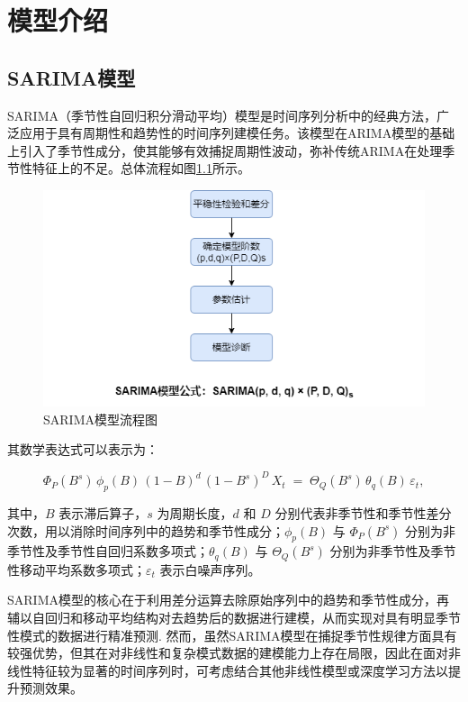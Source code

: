 \chapter{模型介绍}
\label{chapter:model}
\section{SARIMA模型}

SARIMA（季节性自回归积分滑动平均）模型是时间序列分析中的经典方法，广泛应用于具有周期性和趋势性的时间序列建模任务。该模型在ARIMA模型的基础上引入了季节性成分，使其能够有效捕捉周期性波动，弥补传统ARIMA在处理季节性特征上的不足。总体流程如图\ref{fig:SARIMA模型流程图}所示。

\begin{figure}[H]
    \centering
    \includegraphics[width=0.75\linewidth]{figure/SARIMA_formula.png}
    \caption{SARIMA模型流程图}
    \label{fig:SARIMA模型流程图}
\end{figure}

其数学表达式可以表示为：

\[
\Phi_P(B^s) \, \phi_p(B) \, (1-B)^d \, (1-B^s)^D \, X_t \;=\; \Theta_Q(B^s) \, \theta_q(B) \, \varepsilon_t,
\]

其中，\( B \) 表示滞后算子，\( s \) 为周期长度，\( d \) 和 \( D \) 分别代表非季节性和季节性差分次数，用以消除时间序列中的趋势和季节性成分；\( \phi_p(B) \) 与 \( \Phi_P(B^s) \) 分别为非季节性及季节性自回归系数多项式；\( \theta_q(B) \) 与 \( \Theta_Q(B^s) \) 分别为非季节性及季节性移动平均系数多项式；\( \varepsilon_t \) 表示白噪声序列。

SARIMA模型的核心在于利用差分运算去除原始序列中的趋势和季节性成分，再辅以自回归和移动平均结构对去趋势后的数据进行建模，从而实现对具有明显季节性模式的数据进行精准预测. 然而，虽然SARIMA模型在捕捉季节性规律方面具有较强优势，但其在对非线性和复杂模式数据的建模能力上存在局限，因此在面对非线性特征较为显著的时间序列时，可考虑结合其他非线性模型或深度学习方法以提升预测效果。

